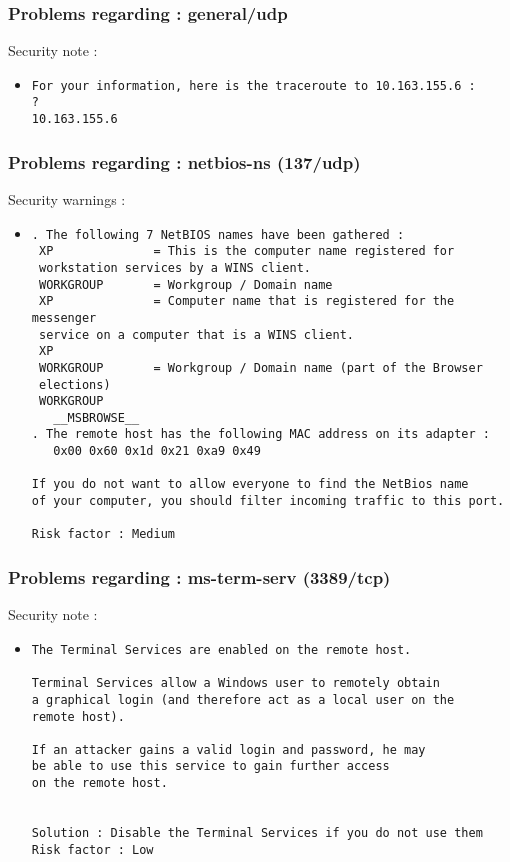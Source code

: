 \documentclass{article}
\begin{document}
\subsubsection{Problems regarding : general/udp}
Security note :\\
\begin{itemize}
\item \begin{verbatim}
For your information, here is the traceroute to 10.163.155.6 : 
?
10.163.155.6

\end{verbatim}\end{itemize}
\subsubsection{Problems regarding : netbios-ns (137/udp)}
Security warnings :\\
\begin{itemize}
\item \begin{verbatim}
. The following 7 NetBIOS names have been gathered :
 XP              = This is the computer name registered for
 workstation services by a WINS client.
 WORKGROUP       = Workgroup / Domain name
 XP              = Computer name that is registered for the messenger
 service on a computer that is a WINS client.
 XP             
 WORKGROUP       = Workgroup / Domain name (part of the Browser
 elections)
 WORKGROUP      
   __MSBROWSE__ 
. The remote host has the following MAC address on its adapter :
   0x00 0x60 0x1d 0x21 0xa9 0x49 

If you do not want to allow everyone to find the NetBios name
of your computer, you should filter incoming traffic to this port.

Risk factor : Medium
\end{verbatim}\end{itemize}
\subsubsection{Problems regarding : ms-term-serv (3389/tcp)}
Security note :\\
\begin{itemize}
\item \begin{verbatim}
The Terminal Services are enabled on the remote host.

Terminal Services allow a Windows user to remotely obtain
a graphical login (and therefore act as a local user on the
remote host).

If an attacker gains a valid login and password, he may
be able to use this service to gain further access
on the remote host.


Solution : Disable the Terminal Services if you do not use them
Risk factor : Low
\end{verbatim}\end{itemize}
\end{document}
